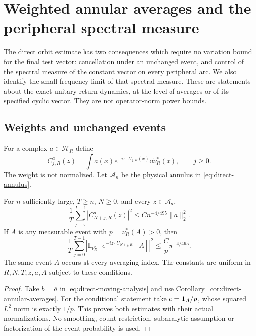 \section{Weighted annular averages and the peripheral spectral measure}
\label{sec:weighted-spectral-averages}
The direct orbit estimate has two consequences which require no
variation bound for the final test vector: cancellation under an
unchanged event, and control of the spectral measure of the constant
vector on every peripheral arc. We also identify the small-frequency
limit of that spectral measure. These are statements about the exact
unitary return dynamics, at the level of averages or of its specified
cyclic vector. They are not operator-norm power bounds.

\subsection{Weights and unchanged events}
For a complex $a\in\mathcal H_R$ define
\begin{equation}\label{eq:averaged-weighted-characteristic}
 C^a_{j,R}(z)=\int a(x)e^{-iz\cdot U_{j,R}(x)}\dd\nu_R^*(x),
       \qquad j\ge0.
\end{equation}
The weight is not normalized. Let $\mathcal A_n$ be the physical
annulus in \eqref{eq:direct-annulus}.

\begin{theorem}
\label{thm:weighted-annular-averages}
For $n$ sufficiently large, $T\ge n$, $N\ge0$, and every
$z\in\mathcal A_n$,
\begin{equation}\label{eq:weighted-annular-averages}
 \frac1T\sum_{j=0}^{T-1}|C^a_{N+j,R}(z)|^2
                    \le Cn^{-4/495}\|a\|_2^2.
\end{equation}
If $A$ is any measurable event with $p=\nu_R^*(A)>0$, then
\begin{equation}\label{eq:unchanged-event-average}
 \frac1T\sum_{j=0}^{T-1}
 \left|\mathbb E_{\nu_R^*}
     [e^{-iz\cdot U_{N+j,R}}\mid A]\right|^2
                    \le \frac C p n^{-4/495}.
\end{equation}
The same event $A$ occurs at every averaging index. The constants are
uniform in $R,N,T,z,a,A$ subject to these conditions.
\end{theorem}
\begin{proof}
Take $b=\overline a$ in
\eqref{eq:direct-moving-analysis} and use
Corollary~\ref{cor:direct-annular-averages}. For the conditional
statement take $a=\mathbf1_A/p$, whose squared $L^2$ norm is exactly
$1/p$. This proves both estimates with their actual normalizations.
No smoothing, count restriction, subanalytic assumption or factorization
of the event probability is used.
\end{proof}


